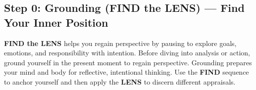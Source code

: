 \documentclass{article}
\begin{document}
\subsection{Step 0: Grounding (FIND the LENS) — Find Your Inner Position}
\textbf{FIND the LENS} helps you regain perspective by pausing to explore goals, emotions, and responsibility with intention. Before diving into analysis or action, ground yourself in the present moment to regain perspective. Grounding prepares your mind and body for reflective, intentional thinking. Use the \textbf{FIND} sequence to anchor yourself and then apply the \textbf{LENS} to discern different appraisals.

\begin{center}
\end{center}
\end{document}
